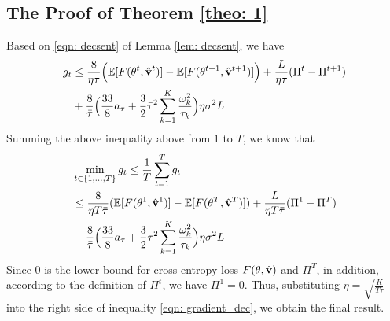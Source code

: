 \documentclass[twoside,journal]{IEEEtran}
\def\VectorFont{\bf}
\newcommand{\vv}{{\VectorFont v}}
\begin{document}
\subsection{The Proof of Theorem \ref{theo: 1}}
Based on \eqref{eqn: decsent} of Lemma \ref{lem: decsent}, we have
\begin{align}\label{eqn: gt1}
\nonumber g_t
&\leq \frac{8}{\eta \bar{\tau}}\Big(\mathbb{E}[F(\theta^{t},\hat{\vv}^t)]-\mathbb{E}[F(\theta^{t+1},\hat{\vv}^{t+1})]\Big)
+
\frac{L}
{\eta\bar{\tau}}(\Pi^{t}-\Pi^{t+1})\\
&+\frac{8}{ \bar{\tau}}\Big(\frac{33}{8}a_{\tau}
+\frac{3}{2}\bar{\tau}^2\sum_{k=1}^K\frac{\omega_k^2}{\tau_k}\Big)\eta\sigma^2L
\end{align}
Summing the above inequality above from $1$ to $T$, we know that
\begin{align}\label{eqn: gradient_dec}
\nonumber&\min_{t\in\{1,\ldots,T\}}g_t\leq\frac{1}{T}\sum_{t=1}^{T}g_t\\
\nonumber&\leq
\frac{8}{\eta T \bar{\tau}}(\mathbb{E}[F(\theta^{1},\hat{\vv}^1)]-\mathbb{E}[F(\theta^{T},\hat{\vv}^{T})])
+
\frac{L}
{\eta T\bar{\tau}}(\Pi^{1}-\Pi^{T})\\
&+\frac{8}{ \bar{\tau}}\Big(\frac{33}{8}a_{\tau}
+\frac{3}{2}\bar{\tau}^2\sum_{k=1}^K\frac{\omega_k^2}{\tau_k}\Big)\eta\sigma^2L
\end{align}
Since 0 is the lower bound for cross-entropy loss $F(\theta,\hat{\vv})$ and $\Pi^{T}$, in addition, according to the definition of $\Pi^t$, we have $\Pi^{1}=0$. Thus, substituting $\eta=\sqrt{\frac{K}{T\bar{\tau}}}$ into the right side of inequality \eqref{eqn: gradient_dec}, we obtain the final result.


\end{document}
